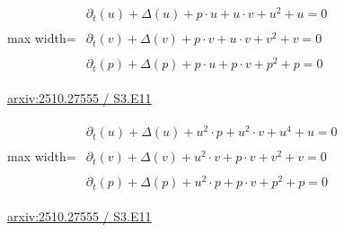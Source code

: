 \documentclass[10pt,a4paper]{article}
\begin{document}
\begin{minipage}{\linewidth}
\begin{center}\begin{adjustbox}{max width=\linewidth}$\displaystyle\begin{gathered}\begin{gathered}\partial_{t}(u)+\Delta(u)+p\cdot u+u\cdot v+u^{2}+u=0\end{gathered}\\[5pt]\begin{gathered}\partial_{t}(v)+\Delta(v)+p\cdot v+u\cdot v+v^{2}+v=0\end{gathered}\\[5pt]\begin{gathered}\partial_{t}(p)+\Delta(p)+p\cdot u+p\cdot v+p^{2}+p=0\end{gathered}\end{gathered}$\end{adjustbox}\end{center}
{\small \href{https://arxiv.org/html/2510.27555#S3.E11}{arxiv:2510.27555 / S3.E11}}\par
\end{minipage}\par\vspace{7mm}

\begin{minipage}{\linewidth}
\begin{center}\begin{adjustbox}{max width=\linewidth}$\displaystyle\begin{gathered}\begin{gathered}\partial_{t}(u)+\Delta(u)+u^{2}\cdot p+u^{2}\cdot v+u^{4}+u=0\end{gathered}\\[5pt]\begin{gathered}\partial_{t}(v)+\Delta(v)+u^{2}\cdot v+p\cdot v+v^{2}+v=0\end{gathered}\\[5pt]\begin{gathered}\partial_{t}(p)+\Delta(p)+u^{2}\cdot p+p\cdot v+p^{2}+p=0\end{gathered}\end{gathered}$\end{adjustbox}\end{center}
{\small \href{https://arxiv.org/html/2510.27555#S3.E11}{arxiv:2510.27555 / S3.E11}}\par
\end{minipage}\par\vspace{7mm}
\end{document}
